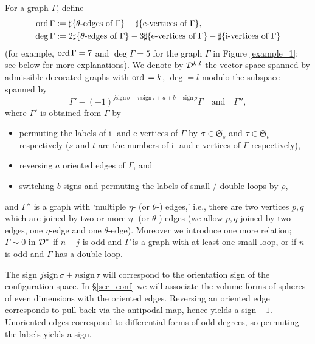 \begin{defn}\label{definition_space_graphs}
For a graph $\Gamma$, define
\begin{align*}
 \mathrm{ord}\, \Gamma &:= \sharp \{ \theta \text{-edges of } \Gamma \} - \sharp \{ \text{e-vertices of } \Gamma \} , \\
 \deg \Gamma &:= 2 \sharp \{ \theta \text{-edges of } \Gamma \} - 3 \sharp \{ \text{e-vertices of } \Gamma \}
 - \sharp \{ \text{i-vertices of } \Gamma \}
\end{align*}
(for example, $\mathrm{ord}\, \Gamma =7$ and $\deg \Gamma =5$ for the graph $\Gamma$ in Figure \ref{example_1}; see below for
more explanations).
We denote by $\mathcal{D}^{k,l}$ the vector space spanned by admissible decorated graphs with $\mathrm{ord}\, =k$, $\deg =l$ modulo the
subspace spanned by
\[
 \Gamma' - (-1)^{j\text{sign}\, \sigma +n\text{sign}\, \tau +a+b+\text{sign}\, \rho}\Gamma
 \quad \text{and} \quad \Gamma'' ,
\]
where $\Gamma'$ is obtained from $\Gamma$ by
\begin{itemize}
\item
 permuting the labels of i- and e-vertices of $\Gamma$ by $\sigma \in \mathfrak{S}_s$ and $\tau \in \mathfrak{S}_t$
 respectively ($s$ and $t$ are the numbers of i- and e-vertices of $\Gamma$ respectively),
\item
 reversing $a$ oriented edges of $\Gamma$, and
\item
 switching $b$ signs and permuting the labels of small / double loops by $\rho$,
\end{itemize}
and $\Gamma''$ is a graph with `multiple $\eta$- (or $\theta$-) edges,' i.e., there are two vertices $p,q$ which are
joined by two or more $\eta$- (or $\theta$-) edges (we allow $p,q$ joined by two edges, one $\eta$-edge and one
$\theta$-edge).
Moreover we introduce one more relation; $\Gamma \sim 0$ in $\mathcal{D}^*$ if $n-j$ is odd and $\Gamma$ is a graph with
at least one small loop, or if $n$ is odd and $\Gamma$ has a double loop.
\end{defn}


\begin{rem}\label{rem_graph}
The sign $j\text{sign}\, \sigma +n\text{sign}\, \tau$ will correspond to the orientation sign of the configuration
space.
In \S \ref{sec_conf} we will associate the volume forms of spheres of even dimensions with the oriented edges.
Reversing an oriented edge corresponds to pull-back via the antipodal map, hence yields a sign $-1$.
Unoriented edges correspond to differential forms of odd degrees, so permuting the labels yields a sign.
\end{rem}


